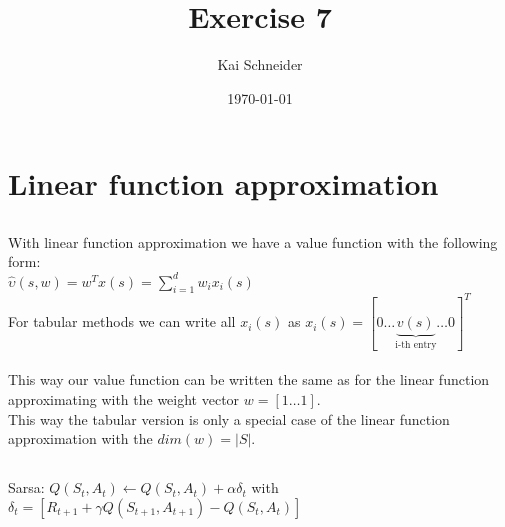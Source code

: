 \documentclass[11pt,a4paper]{article}
\title{Exercise 7}
\author{Kai Schneider}
\date{\today}
\begin{document}
 

\maketitle

\section{Linear function approximation}

\subsection{}

With linear function approximation we have a value function with the following form:\\
$ \hat{\upsilon}(s,w)=w^{T}x(s)=\sum_{i=1}^{d}w_{i}x_{i}(s)$\\
For tabular methods we can write all $x_{i}(s)$ as 
$x_{i}(s)=[0 \dots \underbrace{v(s)}_{\text{i-th entry}}\dots 0]^T$\\\\
This way our value function can be written the same as for the linear function 
approximating with the weight vector $w = [1 \dots 1]$.\\
This way the tabular version is only a special case of the linear function 
approximation with the $dim(w)=|S|$.

\subsection{}

Sarsa: $Q(S_t,A_t) \leftarrow Q(S_t,A_t) + \alpha \delta_{t}$ with  
$\delta_{t}=[R_{t+1}+\gamma Q(S_{t+1},A_{t+1})-Q(S_t,A_t)]$

%
\end{document}
